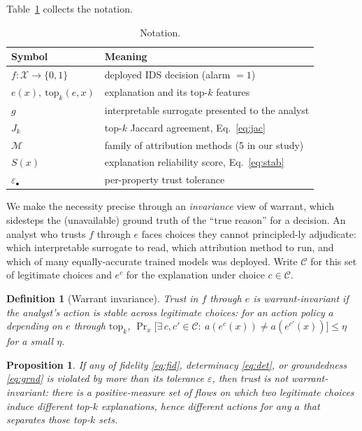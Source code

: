 \documentclass[conference]{IEEEtran}
\newtheorem{proposition}{Proposition}
\newtheorem{definition}{Definition}
\begin{document}
Table~\ref{tab:notation} collects the notation.

\begin{table}[t]
\centering
\caption{Notation.}
\label{tab:notation}
\small\setlength{\tabcolsep}{4pt}
\begin{tabular}{ll}
\toprule
Symbol & Meaning \\
\midrule
$f:\mathcal{X}\to\{0,1\}$ & deployed IDS decision (alarm $=1$) \\
$e(x),\ \mathrm{top}_k(e,x)$ & explanation and its top-$k$ features \\
$g$ & interpretable surrogate presented to the analyst \\
$J_k$ & top-$k$ Jaccard agreement, Eq.~\eqref{eq:jac} \\
$\mathcal{M}$ & family of attribution methods (5 in our study) \\
$S(x)$ & explanation reliability score, Eq.~\eqref{eq:stab} \\
$\varepsilon_{\bullet}$ & per-property trust tolerance \\
\bottomrule
\end{tabular}
\end{table}

We make the necessity precise through an \emph{invariance} view of warrant, which sidesteps the
(unavailable) ground truth of the ``true reason'' for a decision. An analyst who trusts $f$
through $e$ faces choices they cannot principled-ly adjudicate: which interpretable surrogate to
read, which attribution method to run, and which of many equally-accurate trained models was
deployed. Write $\mathcal{C}$ for this set of legitimate choices and $e^c$ for the explanation
under choice $c\in\mathcal{C}$.

\begin{definition}[Warrant invariance]\label{def:warrant}
Trust in $f$ through $e$ is \emph{warrant-invariant} if the analyst's action is stable across
legitimate choices: for an action policy $a$ depending on $e$ through $\mathrm{top}_k$,
$\Pr_x\big[\exists\,c,c'\in\mathcal{C}:\ a(e^c(x))\neq a(e^{c'}(x))\big]\le\eta$ for a small
$\eta$.
\end{definition}

\begin{proposition}\label{prop:nec}
If any of fidelity \eqref{eq:fid}, determinacy \eqref{eq:det}, or groundedness \eqref{eq:grnd}
is violated by more than its tolerance $\varepsilon$, then trust is not warrant-invariant:
there is a positive-measure set of flows on which two legitimate choices induce different top-$k$
explanations, hence different actions for any $a$ that separates those top-$k$ sets.
\end{proposition}
\end{document}
